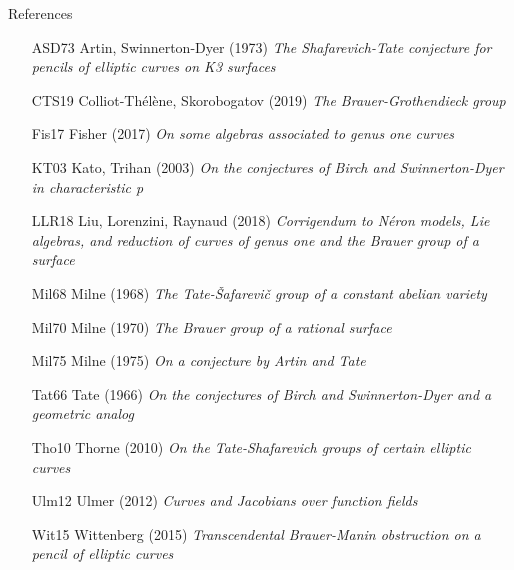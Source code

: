 \documentclass[10pt]{beamer}
\begin{document}
\begin{frame}{References}

\small
\setlength{\leftmargini}{0.5in}
\begin{itemize}
\item[ASD73] Artin, Swinnerton-Dyer (1973) \emph{The Shafarevich-Tate conjecture for pencils of elliptic curves on K3 surfaces}
\item[CTS19] Colliot-Th\'el\`ene, Skorobogatov (2019) \emph{The Brauer-Grothendieck group}
\item[Fis17] Fisher (2017) \emph{On some algebras associated to genus one curves}
\item[KT03] Kato, Trihan (2003) \emph{On the conjectures of Birch and Swinnerton-Dyer in characteristic p}
\item[LLR18] Liu, Lorenzini, Raynaud (2018) \emph{Corrigendum to N\'eron models, Lie algebras, and reduction of curves of genus one and the Brauer group of a surface}
\item[Mil68] Milne (1968) \emph{The Tate-\v Safarevi\v c group of a constant abelian variety}
\item[Mil70] Milne (1970) \emph{The Brauer group of a rational surface}
\item[Mil75] Milne (1975) \emph{On a conjecture by Artin and Tate}
\item[Tat66] Tate (1966) \emph{On the conjectures of Birch and Swinnerton-Dyer and a geometric analog}
\item[Tho10] Thorne (2010) \emph{On the Tate-Shafarevich groups of certain elliptic curves}
\item[Ulm12] Ulmer (2012) \emph{Curves and Jacobians over function fields}
\item[Wit15] Wittenberg (2015) \emph{Transcendental Brauer-Manin obstruction on a pencil of elliptic curves}
\end{itemize}

\end{frame}
\end{document}
